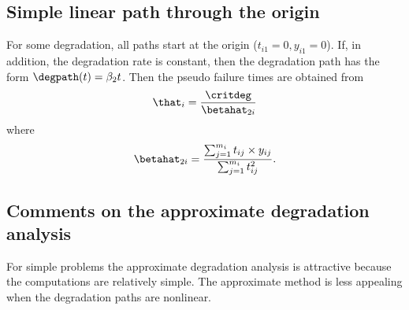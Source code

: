 \subsection{Simple linear path through the origin}
For some degradation, all paths start at the origin ($t_{i1}=0,
y_{i1}=0$). If, in addition, the degradation rate is constant, then
the degradation path has the form $\degpath(t) = \beta_{2}
t$. Then the pseudo failure times are
obtained from
\begin{displaymath}
\that_{i}=\frac{
\critdeg
	       }
 	       {
\betahat_{2i}
		}
\end{displaymath}
where 
\begin{displaymath}
\betahat_{2i}=
\frac{
\sum_{j=1}^{m_{i}} t_{ij} \times y_{ij}
     }
     {
\sum_{j=1}^{m_{i}} t_{ij}^{2}
     }.
\end{displaymath}


\subsection{Comments on the approximate degradation analysis}
For simple problems the approximate degradation analysis is
attractive because the computations are relatively simple.  The
approximate method is less appealing when the degradation paths are
nonlinear.


